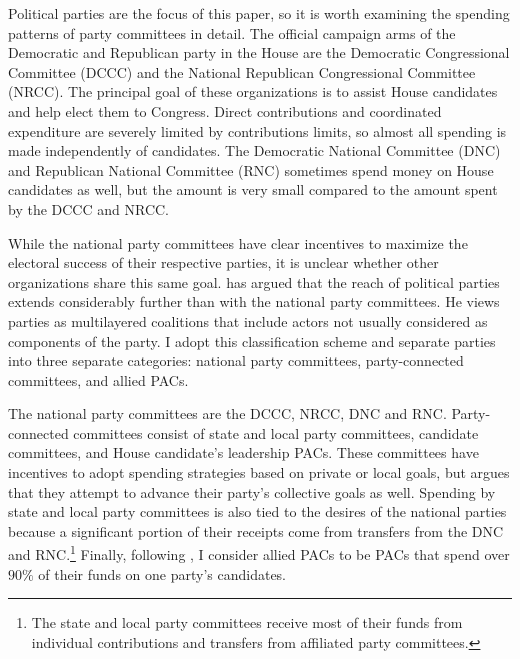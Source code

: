 \documentclass[12pt,final,fleqn]{article}
\theoremstyle{plain}
\begin{document}
Political parties are the focus of this paper, so it is worth examining the spending patterns of party committees in detail. The official campaign arms of the Democratic and Republican party in the House are the Democratic Congressional Committee (DCCC) and the National Republican Congressional Committee (NRCC). The principal goal of these organizations is to assist House candidates and help elect them to Congress. Direct contributions and coordinated expenditure are severely limited by contributions limits, so almost all spending is made independently of candidates. The Democratic National Committee (DNC) and Republican National Committee (RNC) sometimes spend money on House candidates as well, but the amount is very small compared to the amount spent by the DCCC and NRCC.

While the national party committees have clear incentives to maximize the electoral success of their respective parties, it is unclear whether other organizations share this same goal. \citet{herrnson2009roles} has argued that the reach of political parties extends considerably further than with the national party committees. He views parties as multilayered coalitions that include actors not usually considered as components of the party. I adopt this classification scheme and separate parties into three separate categories: national party committees, party-connected committees, and allied PACs. 

The national party committees are the DCCC, NRCC, DNC and RNC. Party-connected committees consist of state and local party committees, candidate committees, and House candidate's leadership PACs. These committees have incentives to adopt spending strategies based on private or local goals, but \citet{herrnson2009roles} argues that they attempt to advance their party's collective goals as well. Spending by state and local party committees is also tied to the desires of the national parties because a significant portion of their receipts come from transfers from the DNC and RNC.\footnote{The state and local party committees receive most of their funds from individual contributions and transfers from affiliated party committees.} Finally, following \citet{herrnson2009roles}, I consider allied PACs to be PACs that spend over $90\%$ of their funds on one party's candidates.
\end{document}
